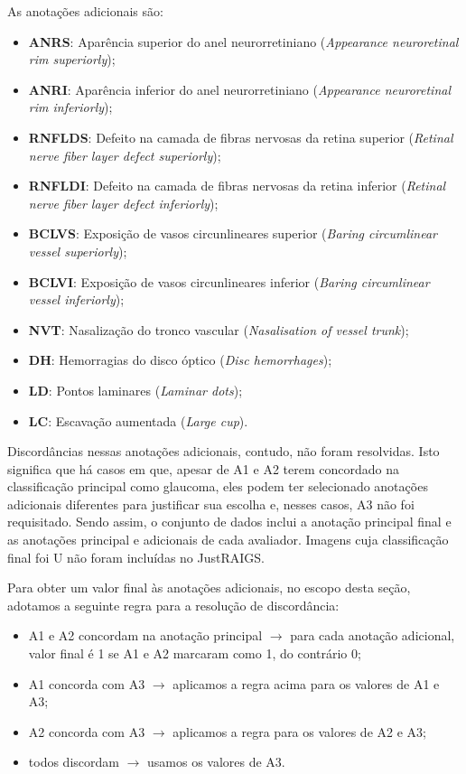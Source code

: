 \documentclass[12pt]{article}
\begin{document}
As anotações adicionais são:
\begin{itemize}
    \setlength\itemsep{0em}
    \item \textbf{ANRS}: Aparência superior do anel neurorretiniano (\emph{Appearance neuroretinal rim superiorly});
    \item \textbf{ANRI}: Aparência inferior do anel neurorretiniano (\emph{Appearance neuroretinal rim inferiorly});
    \item \textbf{RNFLDS}: Defeito na camada de fibras nervosas da retina superior (\emph{Retinal nerve fiber layer defect superiorly});
    \item \textbf{RNFLDI}: Defeito na camada de fibras nervosas da retina inferior (\emph{Retinal nerve fiber layer defect inferiorly});
    \item \textbf{BCLVS}: Exposição de vasos circunlineares superior (\emph{Baring circumlinear vessel superiorly});
    \item \textbf{BCLVI}: Exposição de vasos circunlineares inferior (\emph{Baring circumlinear vessel inferiorly});
    \item \textbf{NVT}: Nasalização do tronco vascular (\emph{Nasalisation of vessel trunk});
    \item \textbf{DH}: Hemorragias do disco óptico (\emph{Disc hemorrhages});
    \item \textbf{LD}: Pontos laminares (\emph{Laminar dots});
    \item \textbf{LC}: Escavação aumentada (\emph{Large cup}).
\end{itemize}

Discordâncias nessas anotações adicionais, contudo, não foram resolvidas. Isto significa que há casos em que, apesar de A1 e A2 terem concordado na classificação principal como glaucoma, eles podem ter selecionado anotações adicionais diferentes para justificar sua escolha e, nesses casos, A3 não foi requisitado. Sendo assim, o conjunto de dados inclui a anotação principal final e as anotações principal e adicionais de cada avaliador. Imagens cuja classificação final foi U não foram incluídas no JustRAIGS.


Para obter um valor final às anotações adicionais, no escopo desta seção, adotamos a seguinte regra para a resolução de discordância:

\begin{itemize}[noitemsep,topsep=0pt]
    \item A1 e A2 concordam na anotação principal $\rightarrow$ para cada anotação adicional, valor final é 1 se A1 e A2 marcaram como 1, do contrário 0;
    \item A1 concorda com A3 $\rightarrow$ aplicamos a regra acima para os valores de A1 e A3;
    \item A2 concorda com A3 $\rightarrow$ aplicamos a regra para os valores de A2 e A3;
    \item todos discordam $\rightarrow$ usamos os valores de A3.
\end{itemize}
\end{document}
